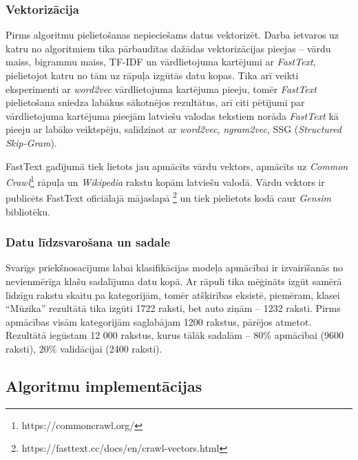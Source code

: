 \subsubsection{Vektorizācija}
Pirms algoritmu pielietošanas nepieciešams datus vektorizēt. Darba ietvaros uz katru no algoritmiem tika pārbaudītas dažādas vektorizācijas pieejas – vārdu maiss, bigrammu maiss, TF-IDF un vārdlietojuma kartējumi ar \textit{FastText}, pielietojot katru no tām uz rāpuļa izgūtās datu kopas. Tika arī veikti eksperimenti ar \textit{word2vec} vārdlietojuma kartējuma pieeju, tomēr \textit{FastText} pielietošana sniedza labākus sākotnējos rezultātus, arī citi pētījumi par vārdlietojuma kartējuma pieejām latviešu valodas tekstiem \cite{LaucisJekabsonWordEmbedding} norāda \textit{FastText} kā pieeju ar labāko veiktspēju, salīdzinot ar \textit{word2vec}, \textit{ngram2vec}, SSG (\textit{Structured Skip-Gram}).

FastText gadījumā tiek lietots jau apmācīts vārdu vektors, apmācīts uz \textit{Common Crawl}\footnote{https://commoncrawl.org/} rāpuļa un \textit{Wikipedia} rakstu kopām latviešu valodā. Vārdu vcktors ir publicēts FastText oficiālajā mājaslapā \footnote{https://fasttext.cc/docs/en/crawl-vectors.html} un tiek pielietots kodā caur \textit{Gensim} bibliotēku.

\subsubsection{Datu līdzsvarošana un sadale}
Svarīgs priekšnosacījums labai klasifikācijas modeļa apmācībai ir izvairīšanās no nevienmērīga klašu sadalījuma datu kopā. Ar rāpuli tika mēģināts izgūt samērā līdzīgu rakstu skaitu pa kategorijām, tomēr atšķirības eksistē, piemēram, klasei “Mūzika” rezultātā tika izgūti 1722 raksti, bet auto ziņām – 1232 raksti. Pirms apmācības visām kategorijām saglabājam 1200 rakstus, pārējos atmetot. Rezultātā iegūstam 12 000 rakstus, kurus tālāk sadalām – 80\% apmācībai (9600 raksti), 20\% validācijai (2400 raksti).

\subsection{Algoritmu implementācijas}

